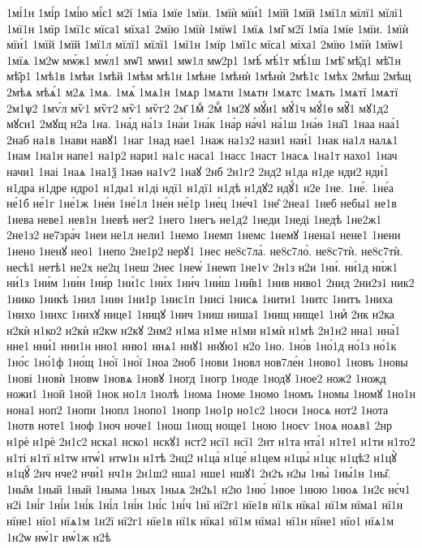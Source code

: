 {1мі́1н
1мі́р
1мі́ю
мі́є1
м2ї
1мїа
1мїе
1мїи.
1мїѝ
мїи́1
1мїй
1мїй
1мї1л
мїлї1
мїлї1
1мї1н
1мїр
1мї1с
мїса1
мїха1
2мїю
1мїѝ
1мїѡ1
1мїѧ
1мі̑
м2ї
1мїа
1мїе
1мїи.
1мїѝ
мїи́1
1мїй
1мїй
1мї1л
мїлї1
мїлї1
1мї1н
1мїр
1мї1с
мїса1
мїха1
2мїю
1мїѝ
1мїѡ1
1мїѧ
1м2ѡ
мѡ́ж1
мѡ́л1
мѡ̑1
мѡи1
мѡ1л
мѡ2р1
1мѣ́
мѣ́1т
мѣ́1ш
1мѣ̑
мѣ̑д1
мѣ̑1н
мѣ̑р1
1мѣ1в
1мѣи
1мѣй
1мѣм
мѣ1н
1мѣне
1мѣнѝ
1мѣнѝ
2мѣ1с
1мѣх
2мѣш
2мѣщ
2мѣѧ
мѣѧ́1
м2ѧ
1мѧ.
1мѧ́
1мѧ1н
1мѧр
1мѧти
1мѧтн
1мѧтс
1мѧть
1мѧтї
1мѧтї
2м1ѱ2
1мѵ́л
мѷ1
мѷг2
мѷ1
мѷг2
2м҃
1мⷣ
2мⷬ
1м2ꙋ
мꙋ́и1
мꙋ́1ч
мꙋ́1ѳ
мꙋ̑1
мꙋ1д2
мꙋси1
2мꙋщ
н2а
1на.
1на́д
на́1з
1на́и
1на́к
1на́р
на́ч1
на́1ш
1на́ѳ
1на̑1
1наа
наа́1
2наб
на1в
1нави
навꙋ1
1наг
1над
нае1
1наж
на1з2
нази1
наи́1
1нак
на1л
налѧ1
1нам
1на1н
напе1
на1р2
нари1
на1с
наса1
1насс
1наст
1насѧ
1на1т
нахо1
1нач
начи1
1наі
1наѧ
1на1ѯ
1наѳ
на1ѵ2
1наꙋ
2нб
2н1г2
2нд2
н1да
н1де
нди2
нди́1
н1дра
н1дре
ндро1
н1ды1
н1ді
ндї1
н1дї1
н1дѣ
н1дꙋ2
ндꙋ́1
н2е
1не.
1не́.
1не́а
не́1б
не́1г
1не́1ж
1не́и
1не́1л
1не́н
не́1р
1не́ц
1не́ч1
1не̑
2неа1
1неб
небы1
не1в
1нева
неве1
нев1н
1невѣ
нег2
1него
1негъ
не1д2
1неди
1неді
1недѣ
1не2ж1
2не1з2
не7зра́ч
1неи
не1л
нели1
1немо
1немп
1немс
1немꙋ
1нена1
нене1
1нени
1нено
1ненꙋ
нео1
1непо
2не1р2
нерꙋ1
1нес
не8с7ла̀.
не8с7ло̀.
не8с7тѝ.
не8с7тѝ.
несѣ1
нетѣ1
не2х
не2ц
1неш
2неє
1неѡ́
1неѡп
1не1ѵ
2н1з
н2и
1ни́.
ни́1д
ни́ж1
ни́1з
1ни́м
1ни́н
1ни́р
1ни́1с
1ни́х
1ни́ч
1ни́ш
1ни̑в1
1нив
ниво1
2нид
2ни2з1
ник2
1нико
1никѣ
1нил
1нин
1ни1р
1нис1п
1нисі
1нисѧ
1нити1
1нитс
1нитъ
1ниха
1нихо
1нихс
1нихꙋ
нице1
1ницꙋ
1нич
1ниш
ниша1
1нищ
нище1
1ниⷯ
2нк
н2ка
н2кѝ
н1ко2
н2кѝ
н2кѡ
н2кꙋ
2нм2
н1ма
н1ме
н1ми
н1мѝ
н1мѣ
2н1н2
нна1
нна́1
нне1
нни́1
нни1н
нно1
нню1
ннѧ1
ннꙋ1
ннꙋю1
н2о
1но.
1но́в
1но́1д
но́1з
но́1к
1но́с
1но́1ф
1но́щ
1но́ї
1но́ї
1ноа
2ноб
1нови
1новл
нов7ле́н
1ново1
1новъ
1новы
1нові
1новѝ
1новѡ
1новѧ
1новꙋ
1ногд
1ногр
1ноде
1нодꙋ
1ное2
нож2
1ножд
ножи1
1ной
1ной
1нок
но1л
1нолѣ
1нома
1номе
1номо
1номъ
1номы
1номꙋ
1но1н
нона1
ноп2
1нопи
1нопл
1нопо1
1нопр
1но1р
но1с2
1носи
1носѧ
нот2
1нота
1нотв
ноте1
1ноф
1ноч
ноче1
1нош
1нощ
ноще1
1ною
1ноєѵ
1ноѧ
ноѧв1
2нр
н1рѐ
н1рѐ
2н1с2
нска1
нско1
нскꙋ1
нст2
нсї1
нсї1
2нт
н1та
нта́1
н1те1
н1ти
н1то2
н1ті
н1тї
н1тѡ
нтѡ́1
нтѡ1н
н1тѣ
2нц2
н1ца̀
н1це́
н1цем
н1цы̀
н1цє
н1цѣ2
н1цꙋ̀
н1цꙋ́
2нч
нче2
нчи́1
нч1н
2н1ш2
нша1
нше1
ншꙋ1
2н2ъ
н2ы
1ны̀
1ны́1н
1ны̑.
1ны̑м
1ный
1ный
1ныма
1ных
1ныѧ
2н2ь1
н2ю
1ню́
1нюе
1нюю
1нюѧ
1н2є
нє́ч1
н2і
1ні́г
1ні́и
1ні́к
1ні́л
1ні́н
1ні́с
1ні́ч
1нї
нї2г1
нїе1в
нї1к
нїка1
нї1м
нїма1
нї1н
нїне1
нїо1
нїѧ1м
1н2ї
нї2г1
нїе1в
нї1к
нїка1
нї1м
нїма1
нї1н
нїне1
нїо1
нїѧ1м
1н2ѡ
нѡ́1г
нѡ́1ж
н2ѣ
}
